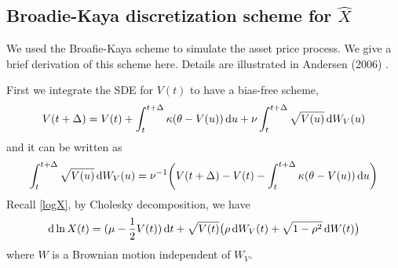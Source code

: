 \documentclass{ws-ijfe}
\begin{document}
\subsection{Broadie-Kaya discretization scheme for $\hat{X}$}

We used the Broafie-Kaya scheme to simulate the asset price process. We give a brief derivation of this scheme here. Details are illustrated in Andersen (2006) \cite{Andersen}.

First we integrate the SDE for $V(t)$ to have a bias-free scheme,
\begin{equation*}
  V(t+\Delta) = V(t)+\int_{t}^{t+\Delta}\kappa(\theta-V(u))\,\mathrm{d} u +\nu\int_{t}^{t+\Delta}\sqrt{V(u)}\,\mathrm{d} W_V(u)
\end{equation*}
and it can be written as
\begin{equation}\label{dW_V}
\int_{t}^{t+\Delta}\sqrt{V(u)}\,\d W_V(u)=\nu^{-1}\bigg(V(t+\Delta)- V(t)-\int_{t}^{t+\Delta}\kappa(\theta-V(u))\,\d u\bigg)
\end{equation}
Recall \eqref{logX}, by Cholesky decomposition, we have
\begin{equation*}
 \mathrm{d} \ln X(t)=(\mu-\frac{1}{2}V(t))\,\mathrm{d} t +\sqrt{V(t)}\big(\rho\,\mathrm{d} W_V(t)+\sqrt{1-\rho^2}\,\mathrm{d} W(t)\big)
\end{equation*}
where $W$ is a Brownian motion independent of $W_V$.
\end{document}
